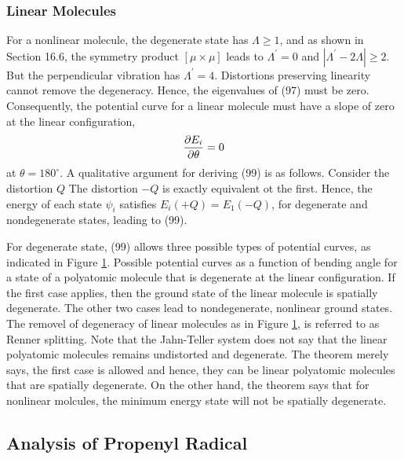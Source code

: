 \subsubsection{Linear Molecules}

For a nonlinear molecule, the degenerate state has $\Lambda \geq 1$, 
and as shown in Section 16.6, the symmetry product $[ \mu \times 
\mu ]$ leads to $\Lambda^{\prime} = 0$ and $| \Lambda^{\prime} - 2 
\Lambda | \geq 2$.  But the perpendicular vibration has 
$\Lambda^{\prime} = 4$.  Distortions preserving linearity cannot 
remove the degeneracy.  Hence, the eigenvalues of (97) must be zero.  
Consequently, the potential curve for a linear molecule must have a 
slope of zero at the linear configuration,
\begin{equation}
{\partial E_i \over \partial \theta} = 0
\label{chap16-eqno99}
\end{equation}
at $\theta = 180^{\circ}$.  A qualitative argument for deriving (99) 
is as follows.  Consider the distortion $Q$
\bigskip
\noindent
The distortion $-Q$
\bigskip
\noindent
is exactly equivalent ot the first.  Hence, the energy of each state 
$\psi_i$ satisfies $E_i(+Q) = E_1(-Q)$, for degenerate and 
nondegenerate states, leading to (99).

\begin{figure}
\caption{}
\label{chap16-fig48}
\end{figure}

For degenerate state, (99) allows three possible types of potential
curves, as indicated in Figure \ref{chap16-fig48}.  Possible potential
curves as a function of bending angle for a state of a polyatomic
molecule that is degenerate at the linear configuration.  If the first
case applies, then the ground state of the linear molecule is
spatially degenerate.  The other two cases lead to nondegenerate,
nonlinear ground states.  The removel of degeneracy of linear
molecules as in Figure \ref{chap16-fig48}, is referred to as Renner
splitting.  Note that the Jahn-Teller system does not say that the
linear polyatomic molecules remains undistorted and degenerate.  The
theorem merely says, the first case is allowed and hence, they can be
linear polyatomic molecules that are spatially degenerate.  On the
other hand, the theorem says that for nonlinear molcules, the minimum
energy state will not be spatially degenerate.

\subsection{Analysis of Propenyl Radical}

